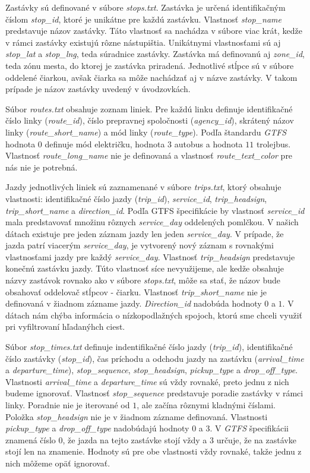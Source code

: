 Zastávky sú definované v súbore \textit{stops.txt}. Zastávka je určená identifikačným číslom \textit{stop\_id}, ktoré je unikátne pre každú zastávku. Vlastnosť \textit{stop\_name} predstavuje názov zastávky. Táto vlastnosť sa nachádza v súbore viac krát, kedže v rámci zastávky existujú rôzne nástupištia. Unikátnymi vlastnosťami sú aj \textit{stop\_lat} a \textit{stop\_lng}, teda súradnice zastávky. Zastávka má definovanú aj \textit{zone\_id}, teda zónu mesta, do ktorej je zastávka priradená. Jednotlivé stĺpce sú v súbore oddelené čiarkou, avšak čiarka sa môže nachádzať aj v názve zastávky. V takom prípade je názov zastávky uvedený v úvodzovkách.

Súbor \textit{routes.txt} obsahuje zoznam liniek. Pre každú linku definuje identifikačné číslo linky (\textit{route\_id}), číslo prepravnej spoločnosti (\textit{agency\_id}), skrátený názov linky (\textit{route\_short\_name}) a mód linky (\textit{route\_type}). Podľa štandardu \textit{GTFS} hodnota $0$ definuje mód električku, hodnota $3$ autobus a hodnota $11$ trolejbus. Vlastnosť \textit{route\_long\_name} nie je definovaná a vlastnosť \textit{route\_text\_color} pre nás nie je potrebná.

Jazdy jednotlivých liniek sú zaznamenané v súbore \textit{trips.txt}, ktorý obsahuje vlastnosti: identifikačné číslo jazdy (\textit{trip\_id}), \textit{service\_id}, \textit{trip\_headsign}, \textit{trip\_short\_name} a \textit{direction\_id}. Podľa GTFS špecifikácie by vlastnosť \textit{service\_id} mala predstavovať množinu rôznych \textit{service\_day} oddelených pomlčkou. V našich dátach existuje pre jeden záznam jazdy len jeden \textit{service\_day}. V prípade, že jazda patrí viacerým \textit{service\_day}, je vytvorený nový záznam s rovnakými vlastnosťami jazdy pre každý \textit{service\_day}. Vlastnosť \textit{trip\_headsign} predstavuje konečnú zastávku jazdy. Túto vlastnosť síce nevyužijeme, ale kedže obsahuje názvy zastávok rovnako ako v súbore \textit{stops.txt}, môže sa stať, že názov bude obsahovať oddelovač stĺpcov - čiarku. Vlastnosť \textit{trip\_short\_name} nie je definovaná v žiadnom zázname jazdy. \textit{Direction\_id} nadobúda hodnoty $0$ a $1$. V dátach nám chýba informácia o nízkopodlažných spojoch, ktorú sme chceli využiť pri vyfiltrovaní hľadanýhch ciest.

Súbor \textit{stop\_times.txt} definuje indentifikačné číslo jazdy (\textit{trip\_id}), identifikačné číslo zastávky (\textit{stop\_id}), čas príchodu a odchodu jazdy na zastávku (\textit{arrival\_time} a \textit{departure\_time}), \textit{stop\_sequence}, \textit{stop\_headsign}, \textit{pickup\_type} a \textit{drop\_off\_type}. Vlastnosti \textit{arrival\_time} a \textit{departure\_time} sú vždy rovnaké, preto jednu z nich budeme ignorovať. Vlastnosť \textit{stop\_sequence} predstavuje poradie zastávky v rámci linky. Poradnie nie je iterované od $1$, ale začína rôznymi kladnými číslami. Položka \textit{stop\_headsign} nie je v žiadnom zázname definovaná. Vlastnosti \textit{pickup\_type} a \textit{drop\_off\_type} nadobúdajú hodnoty $0$ a $3$. V \textit{GTFS} špecifikácii znamená číslo $0$, že jazda na tejto zastávke stojí vždy a $3$ určuje, že na zastávke stojí len na znamenie. Hodnoty sú pre obe vlastnosti vždy rovnaké, takže jednu z nich môžeme opäť ignorovať.


